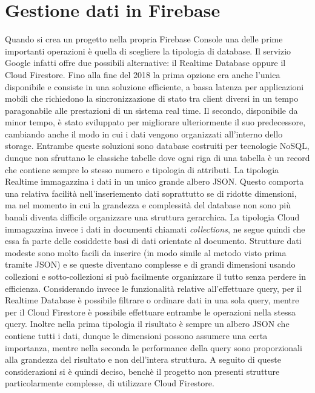 \section{Gestione dati in Firebase}
Quando si crea un progetto nella propria Firebase Console una delle prime
importanti operazioni è quella di scegliere la tipologia di database. Il
servizio Google infatti offre due possibili alternative: il Realtime Database
oppure il Cloud Firestore. Fino alla fine del 2018 la prima opzione era anche
l'unica disponibile e consiste in una soluzione efficiente, a bassa latenza per
applicazioni mobili che richiedono la sincronizzazione di stato tra client
diversi in un tempo paragonabile alle prestazioni di un sistema real time. Il
secondo, disponibile da minor tempo, è stato sviluppato per migliorare
ulteriormente il suo predecessore, cambiando anche il modo in cui i dati vengono
organizzati all'interno dello storage. Entrambe queste soluzioni sono database
costruiti per tecnologie NoSQL, dunque non sfruttano le classiche tabelle dove
ogni riga di una tabella è un record che contiene sempre lo stesso numero e
tipologia di attributi. La tipologia Realtime immagazzina i dati in un unico
grande albero JSON. Questo comporta una relativa facilità nell'inseriemento dati
soprattutto se di ridotte dimensioni, ma nel momento in cui la grandezza e
complessità del database non sono più banali diventa difficile organizzare una
struttura gerarchica. La tipologia Cloud immagazzina invece i dati in documenti
chiamati \textit{collections}, ne segue quindi che essa fa parte delle cosiddette
basi di dati orientate al documento. Strutture dati modeste sono molto facili
da inserire (in modo simile al metodo visto prima tramite JSON) e se queste
diventano complesse e di grandi dimensioni usando collezioni e sotto-collezioni si
può facilmente organizzare il tutto senza perdere in efficienza. Considerando
invece le funzionalità relative all'effettuare query, per il Realtime Database è
possibile filtrare o ordinare dati in una sola query, mentre per il Cloud
Firestore è possibile effettuare entrambe le operazioni nella stessa query.
Inoltre nella prima tipologia il risultato è sempre un albero JSON che contiene
tutti i dati, dunque le dimensioni possono assumere una certa importanza, mentre
nella seconda le performance della query sono proporzionali alla grandezza del
risultato e non dell'intera struttura. A seguito di queste considerazioni si è
quindi deciso, benchè il progetto non presenti strutture particolarmente
complesse, di utilizzare Cloud Firestore. 


